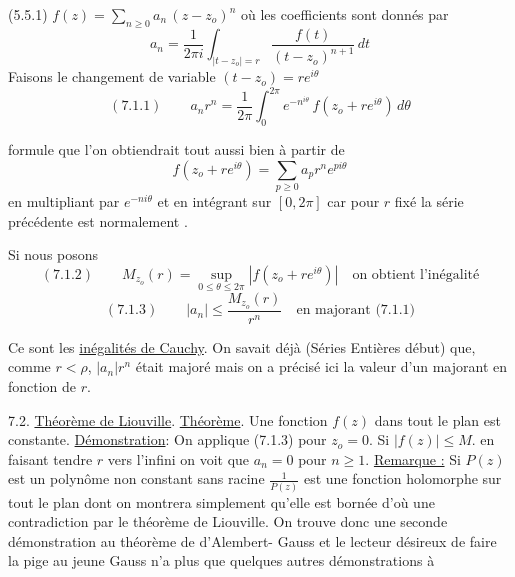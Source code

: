
(5.5.1) \quad $f(z) = \sum_{n \geq 0} a_n \, (z-z_o)^n$ \quad où les coefficients sont donnés par
\[ a_n = \frac{1}{2 \pi i} \int_{|t-z_o|=r} \frac{f(t)}{(t-z_o)^{n+1}} \, dt \]
Faisons le changement de variable \quad $(t-z_o) = r e^{i\theta}$
\[ (7.1.1) \qquad a_n r^n = \frac{1}{2\pi} \int_0^{2\pi} e^{-n^{i\theta}} \, f(z_o + re^{i\theta}) \, d\theta \]

formule que l'on obtiendrait tout aussi bien à partir de
\[ f(z_o + re^{i\theta}) = \sum_{p \geq 0} a_p r^n e^{pi\theta} \]
en multipliant par $e^{-ni\theta}$ et en intégrant sur $[0,2\pi]$ car pour $r$ fixé la série
précédente est normalement .

Si nous posons
\[ (7.1.2) \qquad M_{z_o}(r) = \sup_{0 \leq \theta \leq 2\pi} |f(z_o + re^{i\theta})| \quad \text{on obtient l'inégalité} \]
\[ (7.1.3) \qquad |a_n| \leq \frac{M_{z_o}(r)}{r^n} \quad \text{en majorant (7.1.1)} \]

Ce sont les \uline{inégalités de Cauchy}. On savait déjà (Séries Entières
début) que, comme $r < \rho$, $|a_n| r^n$ était majoré mais on a précisé ici la valeur
d'un majorant en fonction de $r$.

7.2. \uline{Théorème de Liouville}.
\uline{Théorème}. Une fonction $f(z)$  dans tout le plan  est constante.
\uline{Démonstration}: On applique (7.1.3) pour $z_o = 0$.
Si $|f(z)| \leq M$. en faisant tendre $r$ vers l'infini on voit que
$a_n = 0$ pour $n \geq 1$.
\uline{Remarque :} Si $P(z)$ est un polynôme non constant sans racine $\frac{1}{P(z)}$ est une
fonction holomorphe sur tout le plan dont on montrera simplement qu'elle est
bornée d'où une contradiction par le théorème de Liouville. On trouve donc une
seconde démonstration au théorème de d'Alembert- Gauss et le lecteur désireux
de faire la pige au jeune Gauss n'a plus que quelques autres démonstrations à

